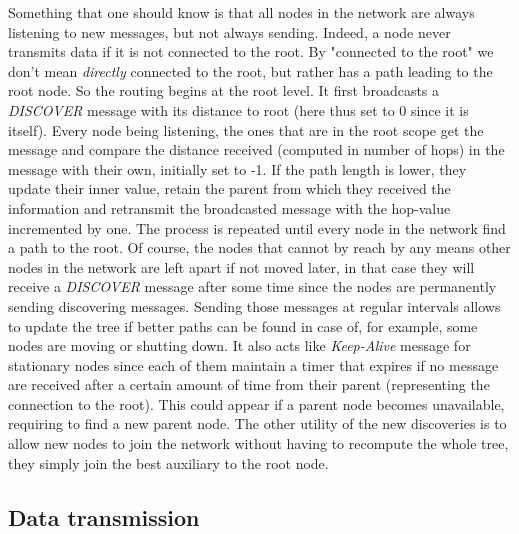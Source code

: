 \documentclass{article}
\begin{document}
Something that one should know is that all nodes in the network are always listening to new messages, but not always sending. Indeed, a node never transmits data if it is not connected to the root. By "connected to the root" we don't mean \textit{directly} connected to the root, but rather has a path leading to the root node. So the routing begins at the root level. It first broadcasts a \textit{DISCOVER} message with its distance to root (here thus set to 0 since it is itself). Every node being listening, the ones that are in the root scope get the message and compare the distance received (computed in number of hops) in the message with their own, initially set to -1. If the path length is lower, they update their inner value, retain the parent from which they received the information and retransmit the broadcasted message with the hop-value incremented by one. The process is repeated until every node in the network find a path to the root. Of course, the nodes that cannot by reach by any means other nodes in the network are left apart if not moved later, in that case they will receive a \textit{DISCOVER} message after some time since the nodes are permanently sending discovering messages. Sending those messages at regular intervals allows to update the tree if better paths can be found in case of, for example, some nodes are moving or shutting down. It also acts like \textit{Keep-Alive} message for stationary nodes since each of them maintain a timer that expires if no message are received after a certain amount of time from their parent (representing the connection to the root). This could appear if a parent node becomes unavailable, requiring to find a new parent node. The other utility of the new discoveries is to allow new nodes to join the network without having to recompute the whole tree, they simply join the best auxiliary to the root node.

\subsection{Data transmission}
\end{document}
